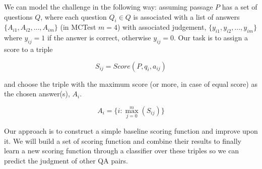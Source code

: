 We can model the challenge in the following way: assuming passage $P$ has a set of questions $Q$,  where each question $Q_i \in Q$ is associated with a list of answers $\{A_{i1}, A_{i2}, ..., A_{im}\}$ (in MCTest $m=4$) with associated judgement, $\{y_{i1}, y_{i2}, ..., y_{im}\}$ where $y_{ij}=1$ if the answer is correct, otherwise $y_{ij}=0$. Our task is to assign a score to a triple 

\begin{equation}
S_{ij}=Score(P, q_{i}, a_{ij})
\end{equation}

and choose the triple with the maximum score (or more, in case of equal score) as the chosen answer(s), $A_{i}$.

\begin{equation}
A_{i} = \{i : \max_{j=0}^{m}(S_{ij})\}
\end{equation}

Our approach is to construct a simple baseline scoring function and improve upon it. We will build a set of scoring function and combine their results to finally learn a new scoring function through a classifier over these triples so we can predict the judgment of other QA pairs.